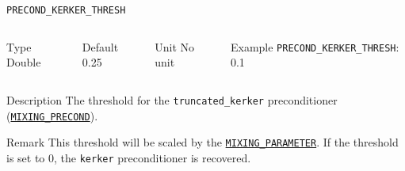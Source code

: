 \documentclass[xcolor=dvipsnames,t]{beamer}
\begin{document}
\begin{frame}[allowframebreaks]{\texttt{PRECOND\_KERKER\_THRESH}} \label{PRECOND_KERKER_THRESH}
\vspace*{-12pt}
\begin{columns}
\begin{block}{Type}
Double
\end{block}

\begin{block}{Default}
0.25
\end{block}

\begin{block}{Unit}
No unit
\end{block}

\begin{block}{Example}
\texttt{PRECOND\_KERKER\_THRESH}: 0.1
\end{block}
\end{columns}

\begin{block}{Description}
The threshold for the \texttt{truncated\_kerker} preconditioner (\hyperlink{MIXING_PRECOND}{\texttt{MIXING\_PRECOND}}).
\end{block}

\begin{block}{Remark}
This threshold will be scaled by the \hyperlink{MIXING_PARAMETER}{\texttt{MIXING\_PARAMETER}}. If the threshold is set to 0, the \texttt{kerker} preconditioner is recovered.
\end{block}

\end{frame}
\end{document}
